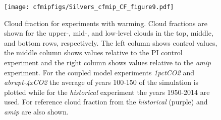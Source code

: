 \documentclass[draft]{agujournal2019}
\begin{document}

\begin{figure}
  \centering
  \texttt{[image: cfmipfigs/Silvers\_cfmip\_CF\_figure9.pdf]}
  \caption{Cloud fraction for experiments with warming.  Cloud fractions are shown for the upper-, mid-, and low-level 
  clouds in the top, middle, and bottom rows, respectively.  The left column shows control values, the middle column
  shows values relative to the PI control experiment and the right column
  shows values relative to the \textit{amip} experiment.  For the coupled model experiments
 \textit{1pctCO2} and \textit{abrupt-4xCO2} the average of years 100-150 of the simulation is plotted while for the 
 \textit{historical} experiment the years 1950-2014 are used.  
  For reference cloud fraction from the 
 \textit{historical} (purple) and \textit{amip} are also shown.}
  \label{fig:CF_warming}
\end{figure}
\end{document}
